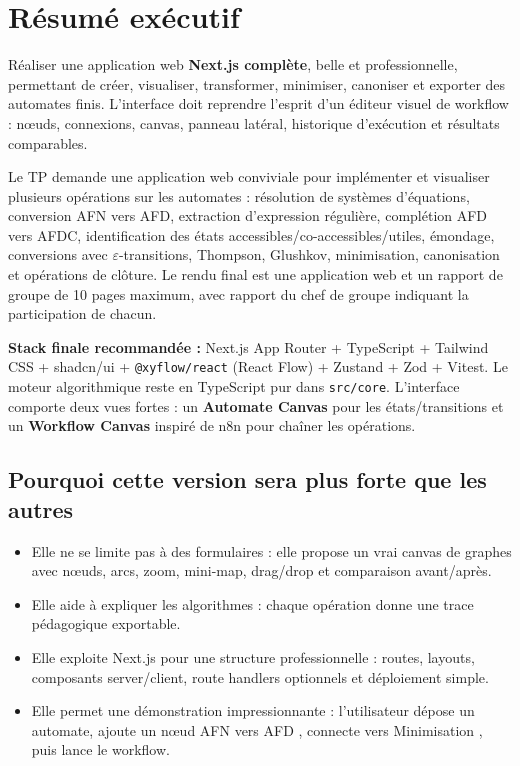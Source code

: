 \documentclass[11pt,a4paper]{report}
\newcommand{\code}[1]{\texttt{#1}}
\newcommand{\eps}{\ensuremath{\varepsilon}}
\begin{document}
\tableofcontents
\clearpage
{}

\chapter*{Résumé exécutif}

\begin{objectifbox}
Réaliser une application web \textbf{Next.js complète}, belle et professionnelle, permettant de créer, visualiser, transformer, minimiser, canoniser et exporter des automates finis. L'interface doit reprendre l'esprit d'un éditeur visuel de workflow : nœuds, connexions, canvas, panneau latéral, historique d'exécution et résultats comparables.
\end{objectifbox}

Le TP demande une application web conviviale pour implémenter et visualiser plusieurs opérations sur les automates : résolution de systèmes d'équations, conversion AFN vers AFD, extraction d'expression régulière, complétion AFD vers AFDC, identification des états accessibles/co-accessibles/utiles, émondage, conversions avec \eps-transitions, Thompson, Glushkov, minimisation, canonisation et opérations de clôture. Le rendu final est une application web et un rapport de groupe de 10 pages maximum, avec rapport du chef de groupe indiquant la participation de chacun.

\begin{decisionbox}
\textbf{Stack finale recommandée :} Next.js App Router + TypeScript + Tailwind CSS + shadcn/ui + \code{@xyflow/react} (React Flow) + Zustand + Zod + Vitest. Le moteur algorithmique reste en TypeScript pur dans \code{src/core}. L'interface comporte deux vues fortes : un \textbf{Automate Canvas} pour les états/transitions et un \textbf{Workflow Canvas} inspiré de n8n pour chaîner les opérations.
\end{decisionbox}

\section*{Pourquoi cette version sera plus forte que les autres}
\begin{itemize}
  \item Elle ne se limite pas à des formulaires : elle propose un vrai canvas de graphes avec nœuds, arcs, zoom, mini-map, drag/drop et comparaison avant/après.
  \item Elle aide à expliquer les algorithmes : chaque opération donne une trace pédagogique exportable.
  \item Elle exploite Next.js pour une structure professionnelle : routes, layouts, composants server/client, route handlers optionnels et déploiement simple.
  \item Elle permet une démonstration impressionnante : l'utilisateur dépose un automate, ajoute un nœud \og AFN vers AFD \fg{}, connecte vers \og Minimisation \fg{}, puis lance le workflow.
\end{itemize}
\end{document}
